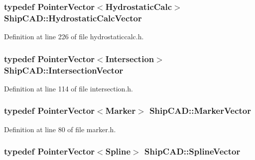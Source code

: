 \hypertarget{namespaceShipCAD_a0c7b012d8868cbb43871cf0bf303ccc6}{
\subsubsection[{Hydrostatic\-Calc\-Vector}]{\setlength{\rightskip}{0pt plus 5cm}typedef {\bf Pointer\-Vector}$<${\bf Hydrostatic\-Calc}$>$ {\bf Ship\-C\-A\-D\-::\-Hydrostatic\-Calc\-Vector}}}\label{namespaceShipCAD_a0c7b012d8868cbb43871cf0bf303ccc6}


Definition at line 226 of file hydrostaticcalc.\-h.

\hypertarget{namespaceShipCAD_a9910f0963197f9df6125398efd4fa139}{
\subsubsection[{Intersection\-Vector}]{\setlength{\rightskip}{0pt plus 5cm}typedef {\bf Pointer\-Vector}$<${\bf Intersection}$>$ {\bf Ship\-C\-A\-D\-::\-Intersection\-Vector}}}\label{namespaceShipCAD_a9910f0963197f9df6125398efd4fa139}


Definition at line 114 of file intersection.\-h.

\hypertarget{namespaceShipCAD_a36fff5b53986f6d6976afc749463ef22}{
\subsubsection[{Marker\-Vector}]{\setlength{\rightskip}{0pt plus 5cm}typedef {\bf Pointer\-Vector}$<${\bf Marker}$>$ {\bf Ship\-C\-A\-D\-::\-Marker\-Vector}}}\label{namespaceShipCAD_a36fff5b53986f6d6976afc749463ef22}


Definition at line 80 of file marker.\-h.

\hypertarget{namespaceShipCAD_a053b941b2c87049bb9380428d4d5a056}{
\subsubsection[{Spline\-Vector}]{\setlength{\rightskip}{0pt plus 5cm}typedef {\bf Pointer\-Vector}$<${\bf Spline}$>$ {\bf Ship\-C\-A\-D\-::\-Spline\-Vector}}}\label{namespaceShipCAD_a053b941b2c87049bb9380428d4d5a056}


